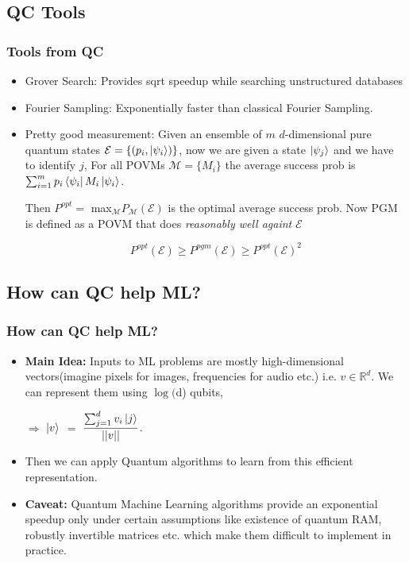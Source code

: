 \documentclass{beamer}
\begin{document}
\subsection{QC Tools}
\begin{frame}\frametitle{Tools from QC}
\begin{itemize}
\item Grover Search: Provides sqrt speedup while searching unstructured databases
\item Fourier Sampling: Exponentially faster than classical Fourier Sampling.
\item Pretty good measurement: Given an ensemble of $m$ $d$-dimensional
pure quantum states $\mathcal{E} = \{ (p_{i}, \ket{\psi_{i}})\}$, now we are given
a state $\ket{\psi_{j}}$ and we have to identify $j$, For all 
POVMs $\mathcal{M} = \{M_{i}\}$ the average success prob is $\sum_{i=1}^{m} p_{i}\bra{\psi_{i}}M_{i}\ket{\psi_{i}}$.

Then $P^{opt}=$ max$_{\mathcal{M}}P_{\mathcal{M}}(\mathcal{E})$
is the optimal average success prob. Now PGM is defined as a POVM 
that does \textit{reasonably well againt} $\mathcal{E}$

    \[ P^{opt}(\mathcal{E}) \geq P^{pgm}({\mathcal{E}}) \geq P^{opt}(\mathcal{E})^{2} \]

\end{itemize} 
\end{frame}


\subsection{How can QC help ML?}
\begin{frame}\frametitle{How can QC help ML?}
\begin{itemize}
\item \textbf{Main Idea:} Inputs to ML problems are mostly 
high-dimensional vectors(imagine pixels for images, frequencies for audio etc.) i.e. $v \in \mathbb{R}^d$.
We can represent them using $\log($d) qubits,

$\Rightarrow$ $\ket{v}$ $=$ $\dfrac{\sum_{j=1}^{d} v_{i}\ket{j}}{||v||}$.

\item Then we can apply Quantum algorithms to learn from this efficient representation.
\item \textbf{Caveat:} Quantum Machine Learning algorithms provide an exponential speedup only under 
certain assumptions like existence of quantum RAM,  robustly invertible matrices etc. which make them 
difficult to implement in practice.

\end{itemize} 
\end{frame}
\end{document}
